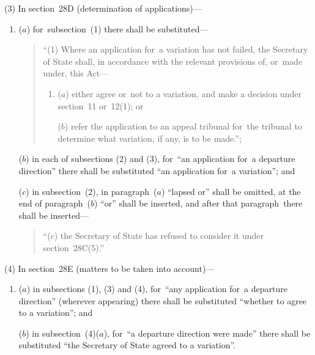 \documentclass[12pt,a4paper]{article}
\begin{document}
(3) In section~28D (determination of applications)—
\begin{enumerate}\item[]
($a$) for~subsection~(1)  there shall be substituted—
\begin{quotation}
“(1) Where an application for~a variation has not failed, the Secretary of State shall, in accordance with the relevant provisions of, or~made under, this Act—
\begin{enumerate}\item[]
($a$) either agree or~not to a variation, and make a decision under section~11 or~12(1); or

($b$) refer the application to an appeal tribunal for~the tribunal to determine what variation, if any, is to be made.”;
\end{enumerate}
\end{quotation}

($b$) in each of subsections (2)  and (3), for~“an application for~a departure direction” there shall be substituted “an application for~a variation”; and

($c$) in subsection~(2), in paragraph~($a$)  “lapsed or” shall be omitted, at the end of paragraph~($b$)  “or” shall be inserted, and after that paragraph~there shall be inserted—
\begin{quotation}
“($c$) the Secretary of State has refused to consider it under section~28C(5).”
\end{quotation}
\end{enumerate}

(4) In section~28E (matters to be taken into account)—
\begin{enumerate}\item[]
($a$) in subsections (1), (3)  and (4), for~“any application for~a departure direction” (wherever appearing) there shall be substituted “whether to agree to a variation”; and

($b$) in subsection~(4)($a$), for~“a departure direction were made” there shall be substituted “the Secretary of State agreed to a variation”.
\end{enumerate}
\end{document}
